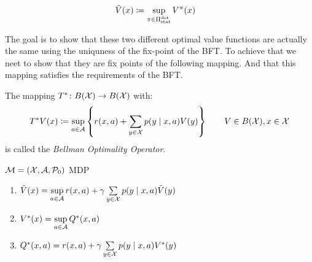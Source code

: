 \begin{definition}
\begin{align*}
	\tilde{V}(x)&\coloneqq \sup_{\pi\in\Pi_{\textnormal{stat}}^{\textnormal{det}}} V^\pi(x)
\end{align*}
\end{definition}

The goal is to show that these two different optimal value functions are actually the same using the uniquness of the fix-point of the BFT. To achieve that we neet to show that they are fix points of the following mapping. And that this mapping satisfies the requirements of the BFT.

\begin{definition}
The mapping \(T^*\colon B(\mathcal{X})\to B(\mathcal{X})\) with:
	\[
	 T^* V(x)\coloneqq \sup_{a\in\mathcal{A}}\left\{r(x,a)+\sum_{y\in\mathcal{X}}p(y\mid x,a) V(y)\right\} \qquad V\in B(\mathcal{X}), x\in\mathcal{X}
	\]
is called the \emph{Bellman Optimality Operator}.
\end{definition}


\begin{lemma}\label{V*,Q* relation}\(\mathcal{M}=(\mathcal{X},\mathcal{A},\mathcal{P}_0)\) MDP
\begin{enumerate}[label=\textbf{(\roman*)},font=\normalfont]
\item\label{i:1} \(\tilde{V}(x)=\sup\limits_{a\in\mathcal{A}} r(x,a)+\gamma\sum\limits_{y\in\mathcal{X}}p(y\mid x,a)\tilde{V}(y) \)
\item\label{i:3} \(V^*(x)=\sup\limits_{a\in\mathcal{A}}Q^*(x,a)\)
\item\label{i:4} \(Q^*(x,a)=r(x,a)+\gamma \sum\limits_{y\in\mathcal{X}}p(y\mid x,a) V^*(y)\)
\end{enumerate}
\end{lemma}

